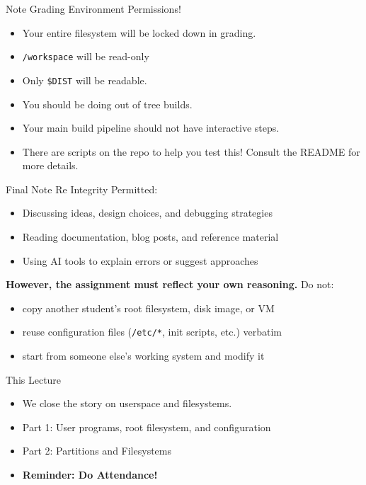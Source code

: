 \documentclass{../lecture}
\begin{document}
\begin{frame}{Note Grading Environment Permissions!}
  \begin{itemize}
    \item Your entire filesystem will be locked down in grading.
    \item \texttt{/workspace} will be read-only
    \item Only \texttt{\$DIST} will be readable.
    \item You should be doing out of tree builds.
    \item Your main build pipeline should not have interactive steps.
    \item There are scripts on the repo to help you test this! Consult the
      README for more details.
  \end{itemize}
\end{frame}

\begin{frame}{Final Note Re Integrity}
  Permitted:
  \begin{itemize}
    \item Discussing ideas, design choices, and debugging strategies
    \item Reading documentation, blog posts, and reference material
    \item Using AI tools to explain errors or suggest approaches
  \end{itemize}

  \textbf{However, the assignment must reflect your own reasoning.} Do not:
  \begin{itemize}
    \item copy another student's root filesystem, disk image, or VM
    \item reuse configuration files (\texttt{/etc/*}, init scripts, etc.) verbatim
    \item start from someone else's working system and modify it
  \end{itemize}
\end{frame}

\begin{frame}{This Lecture}
  \begin{itemize}
    \item We close the story on userspace and filesystems.
    \item Part 1: User programs, root filesystem, and configuration
    \item Part 2: Partitions and Filesystems
    \item \textbf{Reminder: Do Attendance!}
  \end{itemize}
\end{frame}
\end{document}
